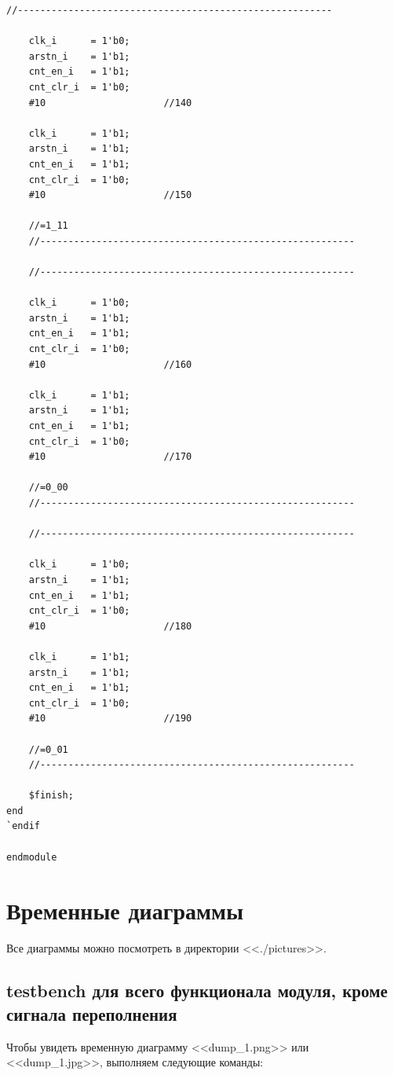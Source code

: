 \documentclass[12pt, a4paper]{article}
\begin{document}
\begin{lstlisting}[caption={Содержимое файла ./tb/tb\_overflow.v}, label={lst:example}]
	//--------------------------------------------------------
	
	clk_i      = 1'b0;
	arstn_i    = 1'b1;
	cnt_en_i   = 1'b1;
	cnt_clr_i  = 1'b0;
	#10                     //140
	
	clk_i      = 1'b1;
	arstn_i    = 1'b1;
	cnt_en_i   = 1'b1;
	cnt_clr_i  = 1'b0;
	#10                     //150
	
	//=1_11
	//--------------------------------------------------------
	
	//--------------------------------------------------------
	
	clk_i      = 1'b0;
	arstn_i    = 1'b1;
	cnt_en_i   = 1'b1;
	cnt_clr_i  = 1'b0;
	#10                     //160
	
	clk_i      = 1'b1;
	arstn_i    = 1'b1;
	cnt_en_i   = 1'b1;
	cnt_clr_i  = 1'b0;
	#10                     //170
	
	//=0_00
	//--------------------------------------------------------
	
	//--------------------------------------------------------
	
	clk_i      = 1'b0;
	arstn_i    = 1'b1;
	cnt_en_i   = 1'b1;
	cnt_clr_i  = 1'b0;
	#10                     //180
	
	clk_i      = 1'b1;
	arstn_i    = 1'b1;
	cnt_en_i   = 1'b1;
	cnt_clr_i  = 1'b0;
	#10                     //190
	
	//=0_01
	//--------------------------------------------------------
	
	$finish;
end
`endif

endmodule

\end{lstlisting}
	
	
	\section{Временные диаграммы}
	
	Все диаграммы можно посмотреть в директории <<./pictures>>.
	
	\subsection{testbench для всего функционала модуля, кроме сигнала переполнения}
	
	Чтобы увидеть временную диаграмму <<dump\_1.png>> или <<dump\_1.jpg>>, выполняем следующие команды:
	
\end{document}
